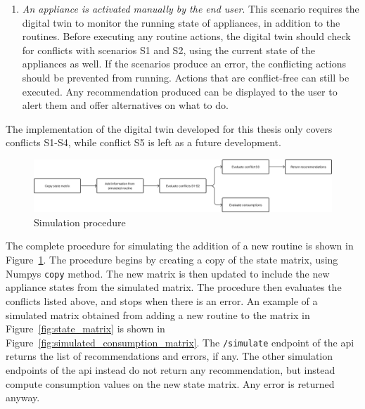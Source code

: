 \begin{enumerate}[label={\textit{S\arabic*.}}, leftmargin=3.5em]
    \item \textit{An appliance is activated manually by the end user}. This scenario requires the digital twin to monitor the running state of appliances, in addition to the routines. Before executing any routine actions, the digital twin should check for conflicts with scenarios S1 and S2, using the current state of the appliances as well. If the scenarios produce an error, the conflicting actions should be prevented from running. Actions that are conflict-free can still be executed. Any recommendation produced can be displayed to the user to alert them and offer alternatives on what to do.
\end{enumerate}
The implementation of the digital twin developed for this thesis only covers conflicts S1-S4, while conflict S5 is left as a future development.

\begin{figure}
    \centering
    \includegraphics[width=\textwidth]{images/simulation_procedure.png}
    \caption{Simulation procedure}
    \label{fig:simulation_procedure}
\end{figure}

The complete procedure for simulating the addition of a new routine is shown in Figure~\ref{fig:simulation_procedure}. The procedure begins by creating a copy of the state matrix, using Numpys \texttt{copy} method. The new matrix is then updated to include the new appliance states from the simulated matrix. The procedure then evaluates the conflicts listed above, and stops when there is an error. An example of a simulated matrix obtained from adding a new routine to the matrix in Figure~\ref{fig:state_matrix} is shown in Figure~\ref{fig:simulated_consumption_matrix}. The \texttt{/simulate} endpoint of the \acrshort{api} returns the list of recommendations and errors, if any. The other simulation endpoints of the \acrshort{api} instead do not return any recommendation, but instead compute consumption values on the new state matrix. Any error is returned anyway.

